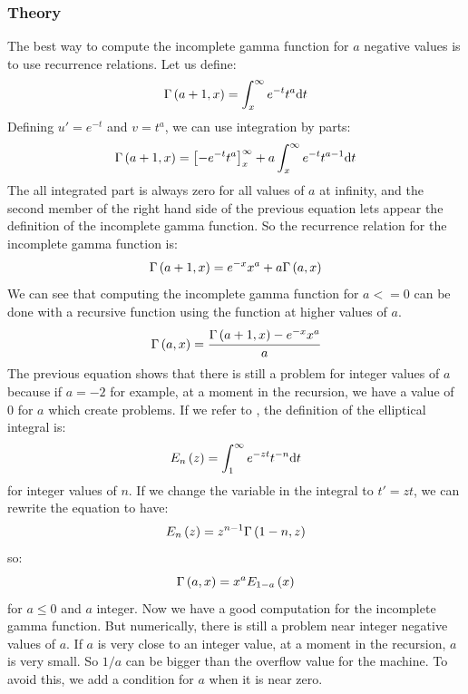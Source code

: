 \subsubsection{Theory}
%
The best way to compute the incomplete gamma function for $a$ negative values
is to use recurrence relations. Let us define:
%
\begin{equation}
    \Gamma\left({a+1,x}\right)=\int_x^\infty{e^{-t}{t^{a}}{\rm{d}}{t}}
\end{equation}
%
Defining $u'=e^{-t}$ and $v=t^a$, we can use integration by parts:
%
\begin{equation}
    \Gamma\left({a+1,x}\right)={\left[-e^{-t}{t^a}\right]}_x^\infty + a \int_x^\infty{e^{-t}{t^{a-1}}{\rm{d}}{t}}
\end{equation}
%
The all integrated part is always zero for all values of $a$ at infinity, and
the second member of the right hand side of the previous equation lets appear
the definition of the incomplete gamma function. So the recurrence relation for
the incomplete gamma function is:
%
\begin{equation}
    \Gamma\left({a+1,x}\right)=e^{-x}{x^a} + a \Gamma\left({a,x}\right)
\end{equation}
%
We can see that computing the incomplete gamma function for $a<=0$ can be done
with a recursive function using the function at higher values of $a$.
%
\begin{equation}
    \Gamma\left({a,x}\right)= \cfrac{\Gamma\left({a+1,x}\right) - e^{-x}{x^a}}{a}
\end{equation}
%
The previous equation shows that there is still a problem for integer values of
$a$ because if $a=-2$ for example, at a moment in the recursion, we have a
value of 0 for $a$ which create problems. If we refer to
\citet{abramowitz+stegun}, the definition of the elliptical integral is:
%
\begin{equation}
    E_n\left({z}\right)=\int_1^\infty{e^{-zt}}{t^{-n}}{\rm{d}}{t}
\end{equation}
%
for integer values of $n$. If we change the variable in the integral to
$t'=zt$, we can rewrite the equation to have:
%
\begin{equation}
    E_n\left({z}\right)={z^{n-1}}\Gamma\left({1-n,z}\right)
\end{equation}
%
so:
%
\begin{equation}
    \Gamma\left({a,x}\right)={x^a}E_{1-a}\left({x}\right)
\end{equation}
%
for $a\leq0$ and $a$ integer. Now we have a good computation for the incomplete
gamma function. But numerically, there is still a problem near integer negative
values of $a$. If $a$ is very close to an integer value, at a moment in the
recursion, $a$ is very small. So $1/a$ can be bigger than the overflow value
for the machine. To avoid this, we add a condition for $a$ when it is near
zero.

